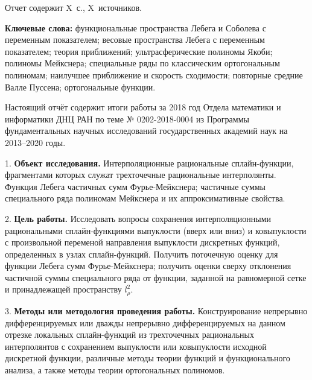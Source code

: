 \Referat %

Отчет содержит X~с., X~источников.

 \bigskip
 \textbf{ Ключевые
  слова:}
  функциональные пространства Лебега и Соболева с переменным показателем; весовые пространства Лебега с переменным показателем; теория приближений; ультрасферические полиномы Якоби; полиномы Мейкснера; специальные ряды по классическим ортогональным полиномам; наилучшее приближение и скорость сходимости; повторные средние Валле Пуссена; ортогональные функции.

 \bigskip

Настоящий отчёт содержит итоги работы за 2018 год Отдела математики и информатики ДНЦ РАН по теме
№ 0202-2018-0004
из Программы фундаментальных научных исследований государственных академий наук на 2013–2020 годы.



1. \textbf{ Объект исследования.} Интерполяционные рациональные сплайн-функции, фрагментами
которых служат трехточечные  рациональные интерполянты.  Функция Лебега частичных сумм Фурье-Мейкснера;
                     частичные суммы специального ряда полиномам Мейкснера и их аппроксимативные свойства.

2. \textbf{ Цель работы.} Исследовать вопросы сохранения интерполяционными рациональными
сплайн-функциями выпуклости (вверх или вниз) и ковыпуклости с
произвольной переменой направления выпуклости дискретных функций, определенных в узлах
сплайн-функций. Получить поточечную оценку для функции Лебега сумм Фурье-Мейкснера;
             получить оценки сверху отклонения частичной суммы специального ряда от функции, заданной на равномерной сетке и принадлежащей пространству $l^2_\rho$.

3. \textbf{ Методы или методология проведения работы.} Конструирование непрерывно дифференцируемых
или дважды непрерывно дифференцируемых на данном отрезке локальных сплайн-функций
из трехточечных рациональных интерполянтов с сохранением выпуклости или
ковыпуклости исходной дискретной функции, различные методы теории функций и функционального анализа, а также методы теории ортогональных полиномов.

